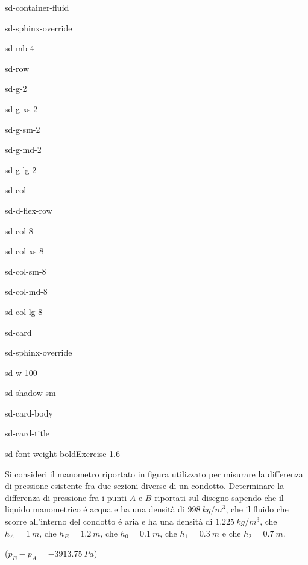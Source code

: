 \documentclass[letterpaper,10pt,italian]{jupyterBook}
\begin{document}
\begin{sphinxuseclass}{sd-container-fluid}
\begin{sphinxuseclass}{sd-sphinx-override}
\begin{sphinxuseclass}{sd-mb-4}
\begin{sphinxuseclass}{sd-row}
\begin{sphinxuseclass}{sd-g-2}
\begin{sphinxuseclass}{sd-g-xs-2}
\begin{sphinxuseclass}{sd-g-sm-2}
\begin{sphinxuseclass}{sd-g-md-2}
\begin{sphinxuseclass}{sd-g-lg-2}
\begin{sphinxuseclass}{sd-col}
\begin{sphinxuseclass}{sd-d-flex-row}
\begin{sphinxuseclass}{sd-col-8}
\begin{sphinxuseclass}{sd-col-xs-8}
\begin{sphinxuseclass}{sd-col-sm-8}
\begin{sphinxuseclass}{sd-col-md-8}
\begin{sphinxuseclass}{sd-col-lg-8}
\begin{sphinxuseclass}{sd-card}
\begin{sphinxuseclass}{sd-sphinx-override}
\begin{sphinxuseclass}{sd-w-100}
\begin{sphinxuseclass}{sd-shadow-sm}
\begin{sphinxuseclass}{sd-card-body}
\begin{sphinxuseclass}{sd-card-title}
\begin{sphinxuseclass}{sd-font-weight-bold}Exercise 1.6
\end{sphinxuseclass}
\end{sphinxuseclass}
\sphinxAtStartPar
Si consideri il manometro riportato in figura utilizzato per misurare la
differenza di pressione esistente fra due sezioni diverse di un condotto.
Determinare la differenza di pressione fra i punti \(A\) e \(B\) riportati
sul disegno sapendo che il liquido manometrico é acqua e ha
una densità di \(998\ kg/m^3\), che il fluido che scorre all’interno
del condotto é aria e ha una densità di \(1.225\ kg/m^3\),
che \(h_A = 1\ m\), che \(h_B = 1.2\ m\), che \(h_0= 0.1\ m\),
che \(h_1 = 0.3\ m\) e che \(h_2 = 0.7\ m\).

\sphinxAtStartPar
(\(p_B-p_A=-3913.75\ Pa\))


\end{sphinxuseclass}
\end{sphinxuseclass}
\end{sphinxuseclass}
\end{sphinxuseclass}
\end{sphinxuseclass}
\end{sphinxuseclass}
\end{sphinxuseclass}
\end{sphinxuseclass}
\end{sphinxuseclass}
\end{sphinxuseclass}
\end{sphinxuseclass}
\end{sphinxuseclass}
\end{sphinxuseclass}
\end{sphinxuseclass}
\end{sphinxuseclass}
\end{sphinxuseclass}
\end{sphinxuseclass}
\end{sphinxuseclass}
\end{sphinxuseclass}
\end{sphinxuseclass}
\end{sphinxuseclass}
\end{document}
